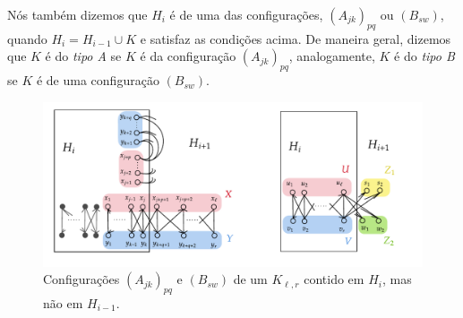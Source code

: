 \documentclass[11pt,twoside,a4paper]{book}
\newcommand{\K}{K_{\ell,r}} %
\theoremstyle{note}
\begin{document}
    Nós também dizemos que $H_i$ é de uma das configurações, $(A_{jk})_{pq}$ ou $(B_{sw})$, 
    quando $H_i = H_{i-1} \cup K$ e satisfaz as condições acima. 
	De maneira geral, dizemos que $K$ é do \textit{tipo A} se $K$ é da configuração $(A_{jk})_{pq}$, analogamente,
		$K$ é do \textit{tipo B} se $K$ é de uma configuração $(B_{sw})$.
  
  \begin{figure}[htb] \centering \includegraphics[]{configAB_KLL.pdf}
   \caption{Configurações $(A_{jk})_{pq}$ e $(B_{sw})$ de um $\K$ contido em $H_i$, mas não em $H_{i-1}$.}
   \label{fig:configKLL}
 \end{figure}
 
\end{document}
